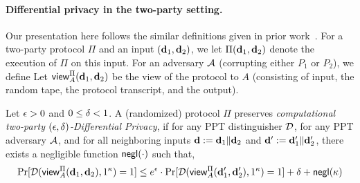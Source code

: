 \paragraph{Differential privacy in the two-party setting.}
Our presentation here follows the similar definitions given in prior
work~\cite{C:BeiNisOmr08,TALG:SCRS17,PoPETS:CDKY20}.  For a two-party protocol
$\Pi$ and an input $({\mathbf{d}}_1, {\mathbf{d}}_2)$, we let $\Pi({\mathbf{d}}_1, {\mathbf{d}}_2)$ denote the
execution of $\Pi$ on this input.  For an adversary $\mathcal{A}$ (corrupting
either $P_1$ or $P_2$), we define Let $\mathsf{view}^\Pi_A({\mathbf{d}}_1, {\mathbf{d}}_2)$ be the view
of the protocol to $A$ (consisting of input, the random tape, the
protocol transcript, and the output). 


\begin{definition}
Let $\epsilon>0$ and $0 \le \delta < 1$. A (randomized) protocol $\Pi$
preserves \emph{computational two-party $(\epsilon,\delta)$-Differential
Privacy}, if for any PPT distinguisher $\cal D$, for any PPT adversary $\mathcal{A}$,
and for all neighboring inputs ${\mathbf{d}} := {\mathbf{d}}_1 \| {\mathbf{d}}_2$ and ${\mathbf{d}}' := {\mathbf{d}}_1' \|
{\mathbf{d}}_2'$, there exists a negligible function $\mathsf{negl}(\cdot)$ such that,
%
\[\Pr[{\cal D}(\mathsf{view}^\Pi_A({\mathbf{d}}_1, {\mathbf{d}}_2),1^\kappa)=1] \le e^\epsilon \cdot
\Pr[{\cal D}(\mathsf{view}^\Pi_A({\mathbf{d}}_1', {\mathbf{d}}_2'),1^\kappa)=1] + \delta +
\mathsf{negl}(\kappa) \]
\end{definition}







